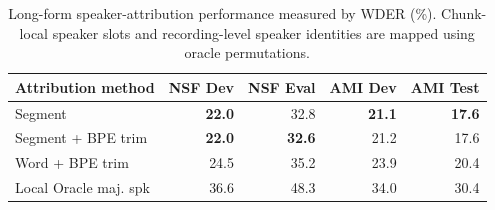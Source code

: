   \begin{table}[t]
    \centering
    \setlength{\tabcolsep}{2pt}
    \caption{Long-form speaker-attribution performance measured by WDER
    (\%). Chunk-local speaker slots and recording-level speaker identities
    are mapped using oracle permutations.}
    \label{tab:longform_wder}
    \begin{tabular}{@{}l|r|r|r|r@{}}
      \toprule
      Attribution method
        & NSF Dev
        & NSF Eval
        & AMI Dev
        & AMI Test \\
      \midrule
      Segment
        & \textbf{22.0}
        & 32.8
        & \textbf{21.1}
        & \textbf{17.6} \\
      Segment + BPE trim
        & \textbf{22.0}
        & \textbf{32.6}
        & 21.2
        & 17.6 \\
      Word + BPE trim
        & 24.5
        & 35.2
        & 23.9
        & 20.4 \\
        \midrule
        Local Oracle maj. spk & 36.6   &    48.3    &  34.0  &     30.4 \\
    
      \bottomrule
    \end{tabular}
    \vspace{-4mm}
  \end{table}